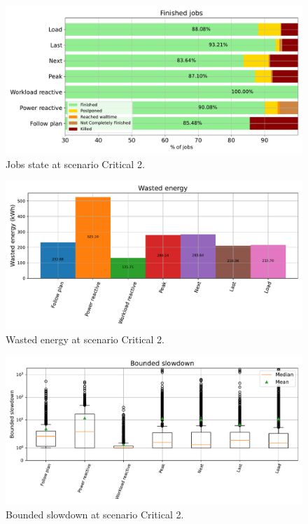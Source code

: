 \begin{figure}[!htb]
    \centering
    \includegraphics[scale=0.55]{Images/Compensations/jobs_critical_2.pdf}
    \caption{Jobs state at scenario Critical 2.}
    \label{fig:jobs_critical_2}
\end{figure}

\begin{figure}[!htb]
    \centering
    \includegraphics[scale=0.55]{Images/Compensations/energy_critical_2.pdf}
    \caption{Wasted energy at scenario Critical 2.}
    \label{fig:energy_critical_2}
\end{figure}

\begin{figure}[!htb]
    \centering
    \includegraphics[scale=0.55]{Images/Compensations/slowdown_critical_2.pdf}
    \caption{Bounded slowdown at scenario Critical 2.}
    \label{fig:slowdown_critical_2}
\end{figure}

